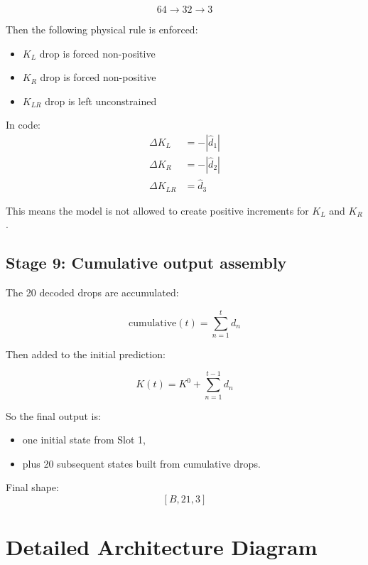 \documentclass[11pt,a4paper]{article}
\begin{document}
$$
64 \rightarrow 32 \rightarrow 3
$$

Then the following physical rule is enforced:

\begin{itemize}[nosep]
    \item $K_L$ drop is forced non-positive
    \item $K_R$ drop is forced non-positive
    \item $K_{LR}$ drop is left unconstrained
\end{itemize}

In code:
\begin{align*}
\Delta K_L &= -|\hat{d}_1| \\
\Delta K_R &= -|\hat{d}_2| \\
\Delta K_{LR} &= \hat{d}_3
\end{align*}

This means the model is not allowed to create positive increments for $K_L$ and $K_R$.

\subsection*{Stage 9: Cumulative output assembly}
The 20 decoded drops are accumulated:

$$
\text{cumulative}(t) = \sum_{n=1}^{t} d_n
$$

Then added to the initial prediction:

$$
K(t) = K^0 + \sum_{n=1}^{t-1} d_n
$$

So the final output is:
\begin{itemize}[nosep]
    \item one initial state from Slot 1,
    \item plus 20 subsequent states built from cumulative drops.
\end{itemize}

Final shape:
$$
[B, 21, 3]
$$

\section{Detailed Architecture Diagram}
\end{document}
